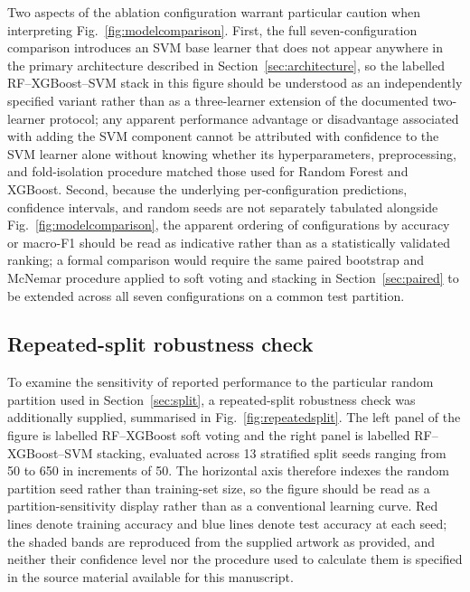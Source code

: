 \documentclass[a4paper,fleqn]{cas-dc}
\begin{document}
Two aspects of the ablation configuration warrant particular caution when interpreting Fig.~\ref{fig:modelcomparison}. First, the full seven-configuration comparison introduces an SVM base learner that does not appear anywhere in the primary architecture described in Section~\ref{sec:architecture}, so the labelled RF--XGBoost--SVM stack in this figure should be understood as an independently specified variant rather than as a three-learner extension of the documented two-learner protocol; any apparent performance advantage or disadvantage associated with adding the SVM component cannot be attributed with confidence to the SVM learner alone without knowing whether its hyperparameters, preprocessing, and fold-isolation procedure matched those used for Random Forest and XGBoost. Second, because the underlying per-configuration predictions, confidence intervals, and random seeds are not separately tabulated alongside Fig.~\ref{fig:modelcomparison}, the apparent ordering of configurations by accuracy or macro-F1 should be read as indicative rather than as a statistically validated ranking; a formal comparison would require the same paired bootstrap and McNemar procedure applied to soft voting and stacking in Section~\ref{sec:paired} to be extended across all seven configurations on a common test partition.

\subsection{Repeated-split robustness check}
\label{sec:repeatedsplit}
 
To examine the sensitivity of reported performance to the particular random partition used in Section~\ref{sec:split}, a repeated-split robustness check was additionally supplied, summarised in Fig.~\ref{fig:repeatedsplit}. The left panel of the figure is labelled RF--XGBoost soft voting and the right panel is labelled RF--XGBoost--SVM stacking, evaluated across 13 stratified split seeds ranging from 50 to 650 in increments of 50. The horizontal axis therefore indexes the random partition seed rather than training-set size, so the figure should be read as a partition-sensitivity display rather than as a conventional learning curve. Red lines denote training accuracy and blue lines denote test accuracy at each seed; the shaded bands are reproduced from the supplied artwork as provided, and neither their confidence level nor the procedure used to calculate them is specified in the source material available for this manuscript.
\end{document}
